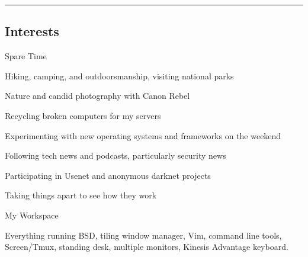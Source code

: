 \documentclass[10pt,letterpaper]{article}
\begin{document}
\hrule
\vspace{-0.4em}
\subsection*{Interests}
\begin{itemize*}
    \item Spare Time
        \begin{itemize*}
            \item Hiking, camping, and outdoorsmanship, visiting national parks
            \item Nature and candid photography with Canon Rebel
            \item Recycling broken computers for my servers
            \item Experimenting with new operating systems and frameworks on the weekend
            \item Following tech news and podcasts, particularly security news
            \item Participating in Usenet and anonymous darknet projects
            \item Taking things apart to see how they work
        \end{itemize*}
    \item My Workspace
        \begin{itemize*}
            \item Everything running BSD, tiling window manager, Vim, command line tools, Screen/Tmux, standing desk, multiple monitors, Kinesis Advantage keyboard.
        \end{itemize*}

\end{itemize*}
\end{document}
